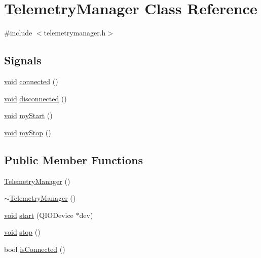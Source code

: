 \hypertarget{class_telemetry_manager}{\section{\-Telemetry\-Manager \-Class \-Reference}
\label{class_telemetry_manager}
}


{\ttfamily \#include $<$telemetrymanager.\-h$>$}

\subsection*{\-Signals}
\begin{DoxyCompactItemize}
\item 
\hyperlink{group___u_a_v_objects_plugin_ga444cf2ff3f0ecbe028adce838d373f5c}{void} \hyperlink{group___u_a_v_talk_plugin_ga54bec8ecfe469710c7261f567e76c5f0}{connected} ()
\item 
\hyperlink{group___u_a_v_objects_plugin_ga444cf2ff3f0ecbe028adce838d373f5c}{void} \hyperlink{group___u_a_v_talk_plugin_ga61e671949cc2403327617d9c9a372a76}{disconnected} ()
\item 
\hyperlink{group___u_a_v_objects_plugin_ga444cf2ff3f0ecbe028adce838d373f5c}{void} \hyperlink{group___u_a_v_talk_plugin_gabb52305ac7bcf975fd60517b0dc9a148}{my\-Start} ()
\item 
\hyperlink{group___u_a_v_objects_plugin_ga444cf2ff3f0ecbe028adce838d373f5c}{void} \hyperlink{group___u_a_v_talk_plugin_gabbe5997234dbee93471fcef62361d276}{my\-Stop} ()
\end{DoxyCompactItemize}
\subsection*{\-Public \-Member \-Functions}
\begin{DoxyCompactItemize}
\item 
\hyperlink{group___u_a_v_talk_plugin_gaab121ca26ff1b0985b013d715132a088}{\-Telemetry\-Manager} ()
\item 
\hyperlink{group___u_a_v_talk_plugin_ga28e48a3688e195cc9c3263ccdeb084c4}{$\sim$\-Telemetry\-Manager} ()
\item 
\hyperlink{group___u_a_v_objects_plugin_ga444cf2ff3f0ecbe028adce838d373f5c}{void} \hyperlink{group___u_a_v_talk_plugin_ga48c17e83f41b742abc5c234963093171}{start} (\-Q\-I\-O\-Device $\ast$dev)
\item 
\hyperlink{group___u_a_v_objects_plugin_ga444cf2ff3f0ecbe028adce838d373f5c}{void} \hyperlink{group___u_a_v_talk_plugin_ga59bfea54673b2ab51e9ac1bf3a186718}{stop} ()
\item 
bool \hyperlink{group___u_a_v_talk_plugin_ga73bf9fbd67f3eb0451363525de9cc7de}{is\-Connected} ()
\end{DoxyCompactItemize}


